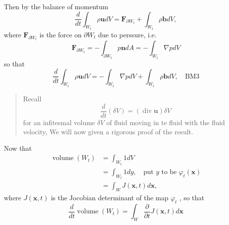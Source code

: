 Then by the balance of momentum
\begin{equation}
\frac{d}{dt} \int_{W_t} \rho \textbf{u} dV = \textbf{F}_{\partial W_t} + \int_{W_t} \rho \textbf{b}dV,
\end{equation}
where $\textbf{F}_{\partial W_t}$ is the force on $\partial W_t$ due to perssure, i.e.
\begin{equation}
\textbf{F}_{\partial W_t} = - \int_{\partial W_t} p\textbf{n}dA = -\int_{W_t} \nabla pdV
\end{equation}
so that 
\begin{equation}
\frac{d}{dt} \int_{W_t} \rho \textbf{u} dV = -\int_{W_t} \nabla pdV + \int_{W_t} \rho \textbf{b}dV,\quad \text{BM3}
\end{equation}


\begin{quote}
	Recall
\begin{equation}
\frac{d}{dt}(\delta V) = (\operatorname{div} \textbf{u}) \delta V
\end{equation}
for an infitesmal volume $\delta V$ of fluid moving in te fluid with the fluid velocity, We will now given a rigorous proof of the result.
\end{quote}

Now that 
\begin{equation}
\begin{aligned}
\operatorname{volume}(W_t)
&= \int_{W_t} 1 dV\\
&= \int_{W_t} 1 dy,\quad \text{put $y$ to be $\varphi_t(\textbf{x})$}\\
&= \int_{W} J(\textbf{x},t) d\textbf{x},
\end{aligned}
\end{equation}
where $J(\textbf{x},t)$ is the Jocobian determinant of the map $\varphi_t$ , so that 
\begin{equation}
\frac{d}{dt}\operatorname{volume}(W_t) = \int_{W} \frac{\partial}{\partial t} J(\textbf{x},t)d\textbf{x}
\end{equation}

